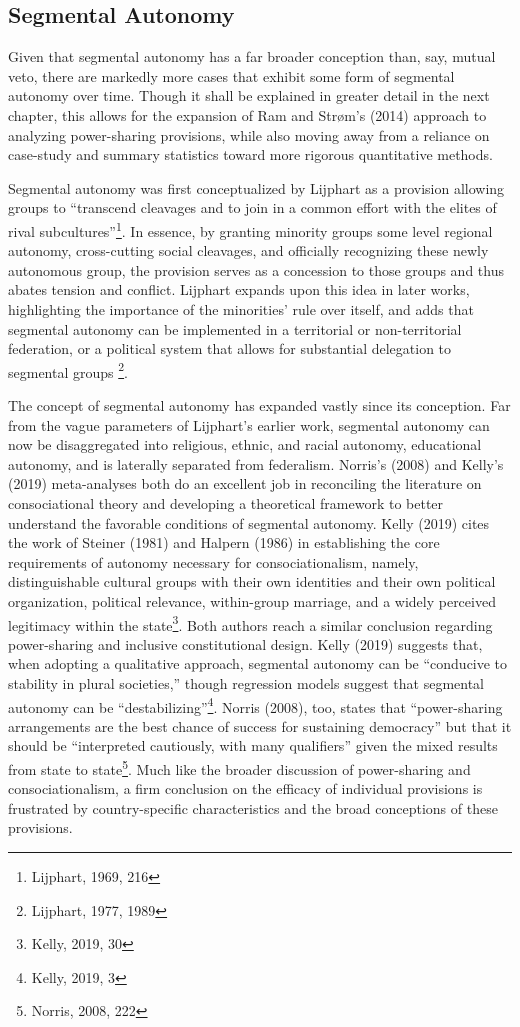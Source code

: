 \documentclass[12pt]{article}
\begin{document}
\subsection{Segmental Autonomy}
Given that segmental autonomy has a far broader conception than, say, mutual veto, there are markedly more cases that exhibit some form of segmental autonomy over time. Though it shall be explained in greater detail in the next chapter, this allows for the expansion of Ram and Strøm’s (2014) approach to analyzing power-sharing provisions, while also moving away from a reliance on case-study and summary statistics toward more rigorous quantitative methods.

Segmental autonomy was first conceptualized by Lijphart as a provision allowing groups to “transcend cleavages and to join in a common effort with the elites of rival subcultures”\footnote{Lijphart, 1969, 216}. In essence, by granting minority groups some level regional autonomy, cross-cutting social cleavages, and officially recognizing these newly autonomous group, the provision serves as a concession to those groups and thus abates tension and conflict. Lijphart expands upon this idea in later works, highlighting the importance of the minorities’ rule over itself, and adds that segmental autonomy can be implemented in a territorial or non-territorial federation, or a political system that allows for substantial delegation to segmental groups \footnote{Lijphart, 1977, 1989}. 

The concept of segmental autonomy has expanded vastly since its conception. Far from the vague parameters of Lijphart’s earlier work, segmental autonomy can now be disaggregated into religious, ethnic, and racial autonomy, educational autonomy, and is laterally separated from federalism. Norris’s (2008) and Kelly’s (2019) meta-analyses both do an excellent job in reconciling the literature on consociational theory and developing a theoretical framework to better understand the favorable conditions of segmental autonomy. Kelly (2019) cites the work of Steiner (1981) and Halpern (1986) in establishing the core requirements of autonomy necessary for consociationalism, namely, distinguishable cultural groups with their own identities and their own political organization, political relevance, within-group marriage, and a widely perceived legitimacy within the state\footnote{Kelly, 2019, 30}. Both authors reach a similar conclusion regarding power-sharing and inclusive constitutional design. Kelly (2019) suggests that, when adopting a qualitative approach, segmental autonomy can be “conducive to stability in plural societies,” though regression models suggest that segmental autonomy can be “destabilizing”\footnote{Kelly, 2019, 3}. Norris (2008), too, states that “power-sharing arrangements are the best chance of success for sustaining democracy” but that it should be “interpreted cautiously, with many qualifiers” given the mixed results from state to state\footnote{Norris, 2008, 222}. Much like the broader discussion of power-sharing and consociationalism, a firm conclusion on the efficacy of individual provisions is frustrated by country-specific characteristics and the broad conceptions of these provisions.
\end{document}
